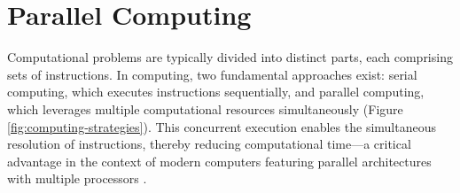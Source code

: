 \documentclass[Ingles]{phdthesis}
\begin{document}
\section{Parallel Computing \label{sec:parallel-computing}}

Computational problems are typically divided into distinct parts, each comprising sets of instructions. In computing, two fundamental approaches exist: serial computing, which executes instructions sequentially, and parallel computing, which leverages multiple computational resources simultaneously (Figure \ref{fig:computing-strategies}). This concurrent execution enables the simultaneous resolution of instructions, thereby reducing computational time---a critical advantage in the context of modern computers  featuring parallel architectures with multiple processors \cite{foster1995,grama2003}.
\end{document}
